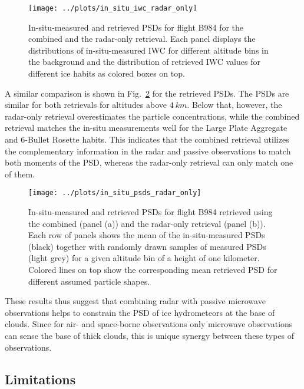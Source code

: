 \documentclass[journal abbreviation, manuscript]{copernicus}
\begin{document}
\begin{figure}[!hbpt]
  \centering
  \texttt{[image: ../plots/in\_situ\_iwc\_radar\_only]}
  \caption{In-situ-measured and retrieved PSDs for flight B984
    for the combined and the radar-only retrieval. Each panel displays
    the distributions of in-situ-measured IWC for different altitude
    bins in the background and the distribution of retrieved IWC values
    for different ice habits as colored boxes on top.}
  \label{fig:in_situ_iwc_radar_only}
\end{figure}

A similar comparison is shown in Fig.~\ref{fig:in_situ_psds_radar_only} for the
retrieved PSDs. The PSDs are similar for both retrievals for altitudes above
$4\ \unit{km}$. Below that, however, the radar-only retrieval overestimates the
particle concentrations, while the combined retrieval matches the in-situ
measurements well for the Large Plate Aggregate and 6-Bullet Rosette habits.
This indicates that the combined retrieval utilizes the complementary
information in the radar and passive observations to match both moments of the
PSD, whereas the radar-only retrieval can only match one of them.

\begin{figure}[!hbpt]
  \centering
  \texttt{[image: ../plots/in\_situ\_psds\_radar\_only]}
  \caption{In-situ-measured and retrieved PSDs for flight B984
    retrieved using the combined (panel (a)) and the radar-only retrieval
    (panel (b)). Each row of panels shows the mean of the in-situ-measured
    PSDs (black) together with randomly drawn samples of measured PSDs
    (light grey) for a given altitude bin of a height of one kilometer.
    Colored lines on top show the corresponding mean retrieved PSD for
    different assumed particle shapes.}
  \label{fig:in_situ_psds_radar_only}
\end{figure}

These results thus suggest that combining radar with passive microwave
observations helps to constrain the PSD of ice hydrometeors at the base of
clouds. Since for air- and space-borne observations only microwave observations
can sense the base of thick clouds, this is unique synergy between these types
of observations.

\subsection{Limitations}
\end{document}
